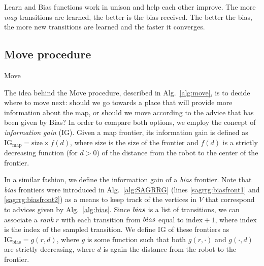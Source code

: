 Learn and Bias functions work in unison and help each other improve. The more \emph{may} transitions are learned, the better is the bias received. The better the bias, the more new transitions are learned and the faster it converges.


\subsection{Move procedure} \label{sec:move}

\begin{algorithm}[t]
    \small
    \DontPrintSemicolon
    \caption{Move}
    \label{alg:move}
\end{algorithm}

The idea behind the Move procedure, described in Alg.~\ref{alg:move}, is to decide where to move next: should we go towards a place that will provide more information about the map, or should we move according to the advice that has been given by Bias? In order to compare both options, we employ the concept of \emph{information gain} (IG). Given a map frontier, its information gain is defined as $\mathrm{IG_{map}} = \mathrm{size} \times f(d)$, where $\mathrm{size}$ is the size of the frontier and $f(d)$ is a strictly decreasing function (for $d > 0$) of the distance from the robot to the center of the frontier.


In a similar fashion, we define the information gain of a \emph{bias} frontier. Note that \emph{bias} frontiers were introduced in Alg.~\ref{alg:SAGRRG} (lines \ref{sagrrg:biasfront1} and \ref{sagrrg:biasfront2}) as a means to keep track of the vertices in $V$ that correspond to advices given by Alg.~\ref{alg:bias}. Since $bias$ is a list of transitions, we can associate a \emph{rank} $r$ with each transition from $bias$ equal to $\mathrm{index}+1$, where $\mathrm{index}$ is the index of the sampled transition. We define IG of these frontiers as $\mathrm{IG_{bias}} = g(r,d)$, where $g$ is some function such that both $g(r, \cdot)$ and $g(\cdot, d)$ are strictly decreasing, where $d$ is again the distance from the robot to the frontier.

